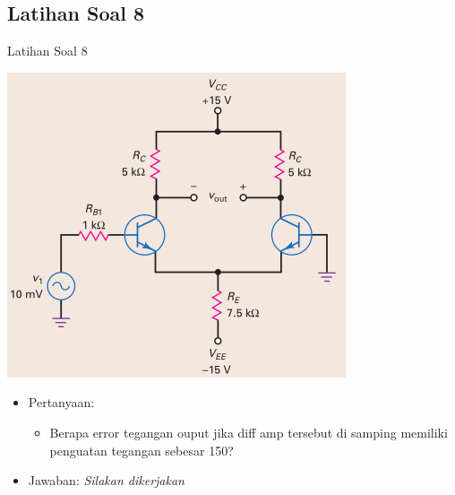 \documentclass[aspectratio=169]{beamer}
\begin{document}
\subsection{Latihan Soal 8}
\begin{frame}{Latihan Soal 8}
	\begin{multicols}{2}
		\begin{center}
			\includegraphics[height=0.7\textheight]{gambar/01.diff-amp/01.latihan_soal_8}
		\end{center}
		\columnbreak
		\begin{itemize}
			\item Pertanyaan:
			\begin{itemize}
				\item Berapa error tegangan ouput jika diff amp tersebut di samping memiliki penguatan tegangan sebesar 150?
			\end{itemize}
			\item Jawaban: \textit{Silakan dikerjakan}
		\end{itemize}
	\end{multicols}
\end{frame}
\end{document}
